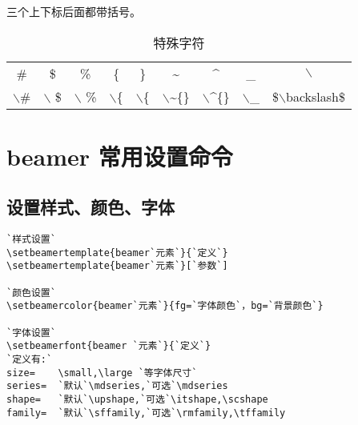 三个上下标后面都带括号。\\
\begin{table}[!h]
  \centering
  \caption{特殊字符}\label{sym}
  \begin{tabular}{ccccccccc}
    \toprule
    \# & \$ & \% & \{ & \} & \~{} & \^{} &\_ & $\backslash$ \\
    $\backslash$\# & $\backslash$ \$ & $\backslash$ \% & $\backslash$\{ & $\backslash$\{
    & $\backslash$\~{}\{\}  &  $\backslash$\^{}\{\} &  $\backslash$\_ & \$$\backslash$backslash\$ \\
    \bottomrule
  \end{tabular}
\end{table}



\section{beamer 常用设置命令}

\subsection{设置样式、颜色、字体}

\begin{lstlisting}
`样式设置`
\setbeamertemplate{beamer`元素`}{`定义`}
\setbeamertemplate{beamer`元素`}[`参数`]

`颜色设置`
\setbeamercolor{beamer`元素`}{fg=`字体颜色`，bg=`背景颜色`}

`字体设置`
\setbeamerfont{beamer `元素`}{`定义`}
`定义有:`
size=	 \small,\large `等字体尺寸`
series=	 `默认`\mdseries,`可选`\mdseries
shape=	 `默认`\upshape,`可选`\itshape,\scshape
family=	 `默认`\sffamily,`可选`\rmfamily,\tffamily
\end{lstlisting}

\clearpage
